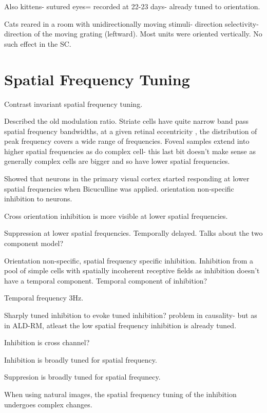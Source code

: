 \cite{Sherk1975} Also kittens- sutured eyes= recorded at 22-23 days- already tuned to orientation. 

\cite{Cynader1975} Cats reared in a room with unidirectionally moving stimuli- direction selectivity- direction of the moving grating (leftward). Most units were oriented vertically. No such effect in the SC. 

\section{Spatial Frequency Tuning}

\cite{Skottun1987} Contrast invariant spatial frequency tuning. 

\cite{DeValois1982a} Described the old modulation ratio. Striate cells have quite narrow band pass spatial frequency bandwidths, at a given retinal eccentricity , the distribution of peak frequency covers a wide range of frequencies.  Foveal samples extend into higher spatial frequencies as do complex cell- this last bit doesn't make sense as generally complex cells are bigger and so have lower spatial frequencies.

\cite{Vidyasagar1994a} Showed that neurons in the primary visual cortex started responding at lower spatial frequencies when Bicuculline was applied. orientation non-specific inhibition to neurons.

\cite{Meese2004} Cross orientation inhibition is more visible at lower spatial frequencies.

\cite{Bredfeldt2002a} Suppression at lower spatial frequencies. Temporally delayed. Talks about the two component model?

\cite{Bauman1991} Orientation non-specific, spatial frequency specific inhibition.  Inhibition from a pool of simple cells with spatially incoherent receptive fields as inhibition doesn't have a temporal component. Temporal component of inhibition?

Temporal frequency 3Hz.

Sharply tuned inhibition to evoke tuned inhibition? problem in causality- but as in ALD-RM, atleast the low spatial frequency inhibition is already tuned. 

Inhibition is cross channel?

\cite{Morrone1982} Inhibition is broadly tuned for spatial frequency.

\cite{DeAngelis1992} Suppresion is broadly tuned for spatial frequnecy. 

\cite{David2004} When using natural images, the spatial frequency tuning of the inhibition undergoes complex changes.

